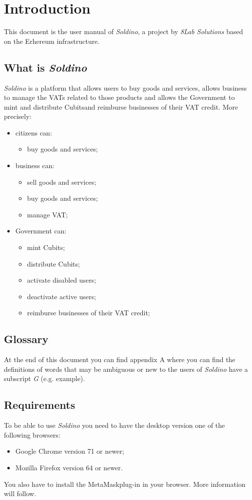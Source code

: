 \section{Introduction} 
This document is the user manual of \textit{Soldino}, a project by 
	\textit{8Lab Solutions} based on the Erhereum infrastructure. 
	\subsection{What is \textit{Soldino}}
	\textit{Soldino} is a platform that allows 
	users to buy goods and services, allows business to manage the VATs 
	related to those products and allows the Government to mint and distribute
	Cubits\glosp and reimburse businesses of their VAT credit.
	More precisely:
	\begin{itemize}
		\item citizens can:
		\begin{itemize}
			\item  buy goods and services;
		\end{itemize}
		\item business can:
		\begin{itemize}
			\item sell goods and services;
			\item buy goods and services;
			\item manage VAT;
		\end{itemize}
		\item Government can:
		\begin{itemize}
			\item mint Cubits\glo;
			\item distribute Cubits\glo;
			\item activate disabled users;
			\item deactivate active users;
			\item reimburse businesses of their VAT credit;
		\end{itemize}
	\end{itemize}
	\subsection{Glossary}
	At the end of this document you can find appendix A where you can find 
	the definitions of words that may be ambiguous or new to the users of 
	\textit{Soldino} have a subscript \textit{G} (e.g. example\glo).
	\subsection{Requirements}
	To be able to use \textit{Soldino} you need to have the desktop version 
	one of the following browsers:
	\begin{itemize}
		\item Google Chrome version 71 or newer;
		\item Mozilla Firefox version 64 or newer.
	\end{itemize}
	You also have to install the MetaMask\glosp plug-in in your browser. More 
	information will follow. 